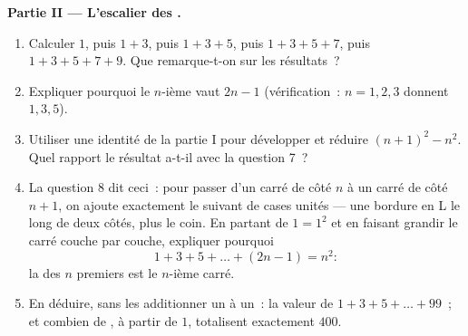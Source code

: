 \begin{problem}[{Devoir maison --- $(a+b)^2$, $(a-b)^2$,
$(a+b)(a-b)$, et la somme $1 + 3 + 5 + \dots + (2n-1) = n^2$}]
\medskip
\noindent\textbf{Partie II --- L'escalier des .}
\begin{enumerate}[resume]
  \item Calculer $1$, puis $1 + 3$, puis $1 + 3 + 5$, puis
        $1 + 3 + 5 + 7$, puis $1 + 3 + 5 + 7 + 9$. Que remarque-t-on
        sur les résultats~?
  \item Expliquer pourquoi le $n$-ième  vaut $2n - 1$
        (vérification~: $n = 1, 2, 3$ donnent $1, 3, 5$).
  \item Utiliser une identité de la partie I pour développer et
        réduire $(n + 1)^2 - n^2$. Quel rapport le résultat a-t-il
        avec la question 7~?
  \item La question 8 dit ceci~: pour passer d'un carré de côté $n$
        à un carré de côté $n + 1$, on ajoute exactement le  suivant de cases unités --- une bordure en L le long
        de deux côtés, plus le coin. En partant de $1 = 1^2$ et en
        faisant grandir le carré couche par couche, expliquer
        pourquoi
        \[
        1 + 3 + 5 + \dots + (2n - 1) = n^2 :
        \]
        la  des $n$ premiers  est le $n$-ième
        carré.
  \item En déduire, sans les additionner un à un~: la valeur de
        $1 + 3 + 5 + \dots + 99$~; et combien de ,
        à partir de $1$, totalisent exactement $400$.
\end{enumerate}


\end{problem}

